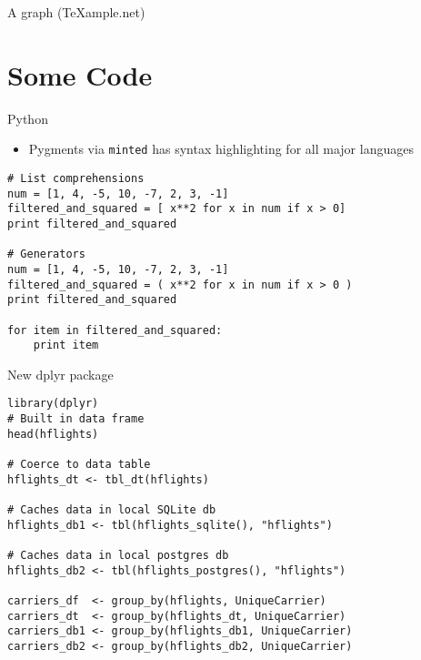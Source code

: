 \documentclass[english,presentation]{pivotalbeamer}
\begin{document}
\begin{frame}[fragile,label=sec-2-3]{A graph (\TeX{}ample.net)}
\end{frame}

\section{Some Code}
\label{sec-3}
\begin{frame}[fragile,label=sec-3-1]{Python}
 \begin{itemize}
\item Pygments via \texttt{minted} has syntax highlighting for all major languages
\end{itemize}
\begin{verbatim}
# List comprehensions
num = [1, 4, -5, 10, -7, 2, 3, -1]
filtered_and_squared = [ x**2 for x in num if x > 0]
print filtered_and_squared

# Generators
num = [1, 4, -5, 10, -7, 2, 3, -1]
filtered_and_squared = ( x**2 for x in num if x > 0 )
print filtered_and_squared

for item in filtered_and_squared:
    print item
\end{verbatim}
\end{frame}

\begin{frame}[fragile,label=sec-3-2]{New dplyr package}
 \begin{verbatim}
library(dplyr)
# Built in data frame
head(hflights)

# Coerce to data table
hflights_dt <- tbl_dt(hflights)

# Caches data in local SQLite db
hflights_db1 <- tbl(hflights_sqlite(), "hflights")

# Caches data in local postgres db
hflights_db2 <- tbl(hflights_postgres(), "hflights")

carriers_df  <- group_by(hflights, UniqueCarrier)
carriers_dt  <- group_by(hflights_dt, UniqueCarrier)
carriers_db1 <- group_by(hflights_db1, UniqueCarrier)
carriers_db2 <- group_by(hflights_db2, UniqueCarrier)
\end{verbatim}
\end{frame}
\end{document}
